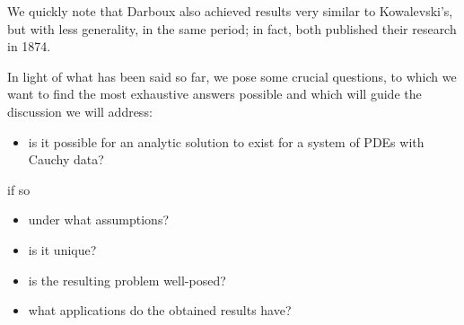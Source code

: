 We quickly note that Darboux also achieved results very similar to Kowalevski's, but with less generality, in the same period; in fact, both published their research in 1874.

In light of what has been said so far, we pose some crucial questions, to which we want to find the most exhaustive answers possible and which will guide the discussion we will address:
\begin{itemize}
\item is it possible for an analytic solution to exist for a system of PDEs with Cauchy data?
\end{itemize}
if so
\begin{itemize}
\item under what assumptions?
\item is it unique?
\item is the resulting problem well-posed?
\item what applications do the obtained results have?
\end{itemize}